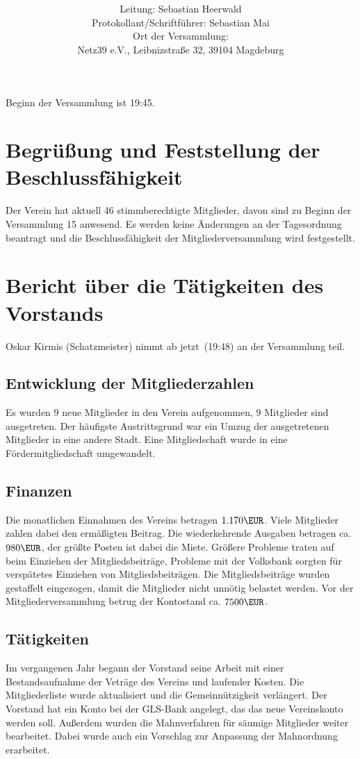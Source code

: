 \documentclass[a4paper,12pt,titlepage]{scrartcl}
\title{ \logo \\ \vspace{0.2\baselineskip} \thetitle}
\author{
Leitung: Sebastian Heerwald\\
Protokollant/Schriftführer: Sebastian Mai \\
Ort der Versammlung:\\ Netz39 e.V., Leibnizstraße 32, 39104 Magdeburg \\
}
\date{\displaydate{date}} %
\begin{document}
\maketitle
\tableofcontents

\clearpage

Beginn der Versammlung ist 19:45.

\section{Begrüßung und Feststellung der Beschlussfähigkeit}

Der Verein hat aktuell 46 stimmberechtigte Mitglieder, davon sind zu Beginn der Versammlung 15 anwesend. Es werden keine Änderungen an der Tagesordnung beantragt und die Beschlussfähigkeit der Mitgliederversammlung wird festgestellt.

\section{Bericht über die Tätigkeiten des Vorstands}
Oskar Kirmis (Schatzmeister) nimmt ab jetzt~(19:48) an der Versammlung teil.

\subsection{Entwicklung der Mitgliederzahlen}
Es wurden 9 neue Mitglieder in den Verein aufgenommen, 9 Mitglieder sind ausgetreten. Der häufigste Austrittsgrund war ein Umzug der ausgetretenen Mitglieder in eine andere Stadt. Eine Mitgliedschaft wurde in eine Fördermitgliedschaft umgewandelt.

\subsection{Finanzen}
Die monatlichen Einnahmen des Vereins betragen $1.170\EUR$. Viele Mitglieder zahlen dabei den ermäßigten Beitrag. Die wiederkehrende Ausgaben betragen ca. $980\EUR$, der größte Posten ist dabei die Miete.
Größere Probleme traten auf beim Einziehen der Mitgliedsbeiträge, Probleme mit der Volksbank sorgten für verspätetes Einziehen von Mitgliedsbeiträgen. Die Mitgliedsbeiträge wurden gestaffelt eingezogen, damit die Mitglieder nicht unnötig belastet werden.
Vor der Mitgliederversammlung betrug der Kontostand ca. $7500\EUR$.

\subsection{Tätigkeiten}
Im vergangenen Jahr begann der Vorstand seine Arbeit mit einer Bestandsaufnahme der Veträge des Vereins und laufender Kosten. Die Mitgliederliste wurde aktualisiert und die Gemeinnützigkeit verlängert. Der Vorstand hat ein Konto bei der GLS-Bank angelegt, das das neue Vereinskonto werden soll. Außerdem wurden die Mahnverfahren für säumige Mitglieder weiter bearbeitet. Dabei wurde auch ein Vorschlag zur Anpassung der Mahnordnung erarbeitet.
\end{document}
